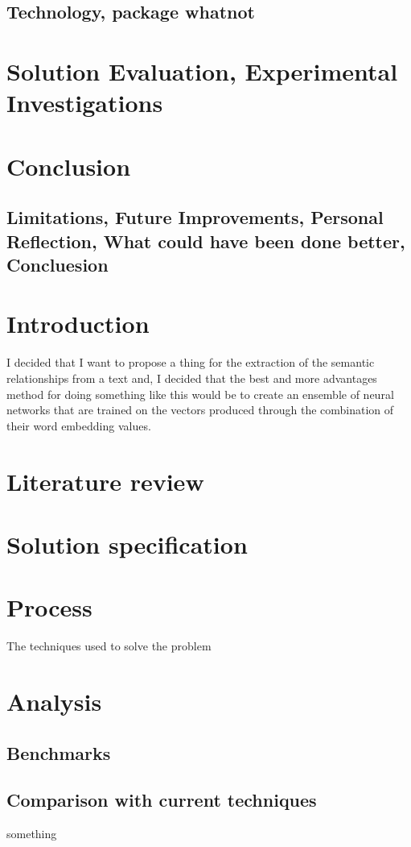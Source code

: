 \documentclass[11pt]{article} %
\begin{document}
\subsection{Technology, package whatnot}

\section{Solution Evaluation, Experimental Investigations}

\section{Conclusion}
\subsection{Limitations, Future Improvements, Personal Reflection, What could have been done better, Concluesion}



\section{Introduction}

I decided that I want to propose a thing for the extraction of the semantic relationships from a
text and, I decided that the best and more advantages method for doing something like this would be 
to create an ensemble of neural networks that are trained on the vectors produced through the 
combination of their word embedding values. 

\section{Literature review}

\section{Solution specification}

\section{Process}
The techniques used to solve the problem

\section{Analysis}

\subsection{Benchmarks}

\subsection{Comparison with current techniques}

something


\end{document}
